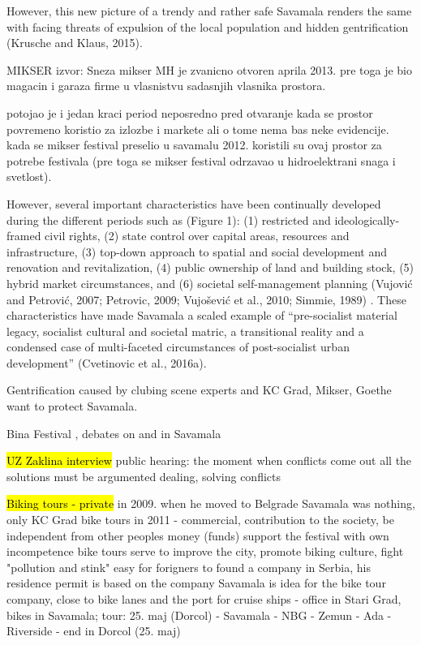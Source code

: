 \documentclass[11pt]{report}
\begin{document}
However, this new picture of a trendy and rather safe Savamala renders the same with facing threats of expulsion of the local population and hidden gentrification (Krusche and Klaus, 2015). 

MIKSER
izvor: Sneza mikser
MH je zvanicno otvoren aprila 2013. 
pre toga je bio magacin i garaza firme u vlasnistvu sadasnjih vlasnika prostora. 

potojao je i jedan kraci period neposredno pred otvaranje kada se prostor povremeno koristio za izlozbe i markete ali o tome nema bas neke evidencije. kada se mikser festival preselio u savamalu 2012. koristili su ovaj prostor za potrebe festivala (pre toga se mikser festival odrzavao u hidroelektrani snaga i svetlost). 

However, several important characteristics have been continually developed during the different periods such as (Figure 1): (1) restricted and ideologically-framed civil rights, (2) state control over capital areas, resources and infrastructure, (3) top-down approach to spatial and social development and renovation and revitalization, (4) public ownership of land and building stock, (5) hybrid market circumstances, and  (6) societal self-management planning (Vujović and Petrović, 2007; Petrovic, 2009; Vujošević et al., 2010; Simmie, 1989) . These characteristics have made Savamala a scaled example of “pre-socialist material legacy, socialist cultural and societal matric, a transitional reality and a condensed case of multi-faceted circumstances of post-socialist urban development” (Cvetinovic et al., 2016a).

Gentrification caused by clubing scene
experts and KC Grad, Mikser, Goethe want to protect Savamala.

Bina Festival , debates on and in Savamala

\hl{UZ Zaklina interview}
public hearing: the moment when conflicts come out
all the solutions must be argumented 
dealing, solving conflicts

\hl{Biking tours - private}
in 2009. when he moved to Belgrade Savamala was nothing, only KC Grad
bike tours in 2011 - commercial, contribution to the society, be independent from other peoples money (funds)
support the festival with own incompetence
bike tours serve to improve the city, promote biking culture, fight "pollution and stink"
easy for forigners to found a company in Serbia, his residence permit is based on the company
Savamala is idea for the bike tour company, close to bike lanes and the port for cruise ships - office in Stari Grad, bikes in Savamala;
tour: 25. maj (Dorcol) - Savamala - NBG - Zemun - Ada - Riverside - end in Dorcol (25. maj)
\end{document}
